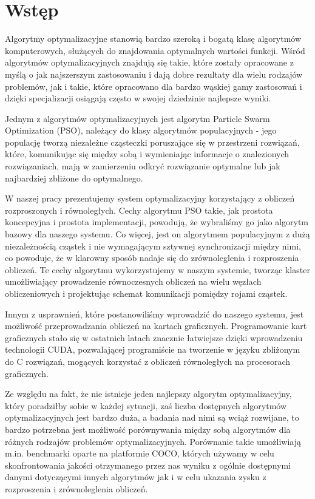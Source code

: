 \documentclass[12pt, twoside, openany, abstract=on]{report}
\theoremstyle{definition}
\begin{document}


\chapter{Wstęp}

Algorytmy optymalizacyjne stanowią bardzo szeroką i bogatą klasę algorytmów komputerowych, służących do znajdowania optymalnych wartości funkcji. Wśród algorytmów optymalizacyjnych znajdują się takie, które zostały opracowane z myślą o jak najszerszym zastosowaniu i dają dobre rezultaty dla wielu rodzajów problemów, jak i takie, które opracowano dla bardzo wąskiej gamy zastosowań i dzięki specjalizacji osiągają często w swojej dziedzinie najlepsze wyniki.

Jednym z algorytmów optymalizacyjnych jest algorytm Particle Swarm Optimization (PSO), należący do klasy algorytmów populacyjnych - jego populację tworzą niezależne cząsteczki poruszające się w przestrzeni rozwiązań, które, komunikując się między sobą i wymieniając informacje o znalezionych rozwiązaniach, mają w zamierzeniu odkryć rozwiązanie optymalne lub jak najbardziej zbliżone do optymalnego.

W naszej pracy prezentujemy system optymalizacyjny korzystający z obliczeń rozproszonych i równoległych. Cechy algorytmu PSO takie, jak prostota koncepcyjna i prostota implementacji, powodują, że wybraliśmy go jako algorytm bazowy dla naszego systemu. Co więcej, jest on algorytmem populacyjnym z dużą niezależnością cząstek i nie wymagającym sztywnej synchronizacji między nimi, co powoduje, że w klarowny sposób nadaje się do zrównoleglenia i rozproszenia obliczeń. Te cechy algorytmu wykorzystujemy w naszym systemie, tworząc klaster umożliwiający prowadzenie równoczesnych obliczeń na wielu węzłach obliczeniowych i projektując schemat komunikacji pomiędzy rojami cząstek. 

Innym z usprawnień, które postanowiliśmy wprowadzić do naszego systemu, jest możliwość przeprowadzania obliczeń na kartach graficznych. Programowanie kart graficznych stało się w ostatnich latach znacznie łatwiejsze dzięki wprowadzeniu technologii CUDA, pozwalającej programiście na tworzenie w języku zbliżonym do C rozwiązań, mogących korzystać z obliczeń równoległych na procesorach graficznych.

Ze względu na fakt, że nie istnieje jeden najlepszy algorytm optymalizacyjny, który poradziłby sobie w każdej sytuacji, zaś liczba dostępnych algorytmów optymalizacyjnych jest bardzo duża, a badania nad nimi są wciąż rozwijane, to bardzo potrzebna jest możliwość porównywania między sobą algorytmów dla różnych rodzajów problemów optymalizacyjnych. Porównanie takie umożliwiają m.in. benchmarki oparte na platformie COCO, których używamy w celu skonfrontowania jakości otrzymanego przez nas wyniku z ogólnie dostępnymi danymi dotyczącymi innych algorytmów jak i w celu ukazania zysku z rozproszenia i zrównoleglenia obliczeń.
\end{document}
